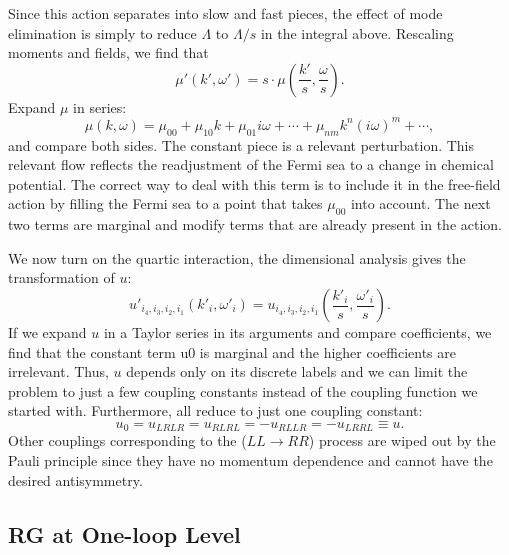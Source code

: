 Since this action separates into slow and fast pieces, the effect of mode elimination is simply to reduce $\Lambda$ to $\Lambda/s$ in the integral above. Rescaling moments and fields, we find that
\begin{equation}
	\mu'(k',\omega') = s\cdot\mu\left(\frac{k'}{s}, \frac{\omega}{s}\right).
\end{equation}
Expand $\mu$ in series:
\begin{equation}
	\mu(k, \omega)=\mu_{00}+\mu_{10} k+\mu_{01} i \omega+\cdots+\mu_{n m} k^{n}(i \omega)^{m}+\cdots,
\end{equation}
and compare both sides. The constant piece is a relevant perturbation.
This relevant flow reflects the readjustment of the Fermi sea to a change in chemical potential. 
The correct way to deal with this term is to include it in the free-field action by filling the Fermi sea to a point that takes $\mu_{00}$ into account. 
The next two terms are marginal and modify terms that are already present in the action.

We now turn on the quartic interaction, the dimensional analysis gives the transformation of $u$:
\begin{equation}
	u'_{i_4,i_3,i_2,i_1}(k'_i,\omega'_i) = u_{i_4,i_3,i_2,i_1}\left(\frac{k'_i}{s},\frac{\omega'_i}{s}\right).
\end{equation}
If we expand $u$ in a Taylor series in its arguments and compare coefficients, we find that the constant term u0 is marginal and the higher coefficients are irrelevant. 
Thus, $u$ depends only on its discrete labels and we can limit the problem to just a few coupling constants instead of the coupling function we started with. 
Furthermore, all reduce to just one coupling constant:
\begin{equation}
	u_0 = u_{LRLR} = u_{RLRL} = -u_{RLLR} = -u_{LRRL} \equiv u.
\end{equation}
Other couplings corresponding to the ($LL \rightarrow RR$) process are wiped out by the Pauli principle since they have no momentum dependence and cannot have the desired antisymmetry.

\subsection{RG at One-loop Level}

